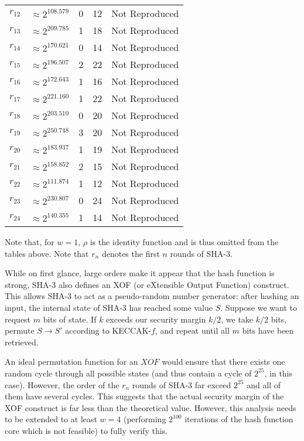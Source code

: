 \documentclass[10pt,twocolumn,twoside]{pnas-new}
\begin{document}
\begin{tabular}{c c c c c}
    $r_{12}$ & $\approx 2^{108.579}$ & 0 & 12 & Not Reproduced \\
    $r_{13}$ & $\approx 2^{209.785}$ & 1 & 18 & Not Reproduced \\
    $r_{14}$ & $\approx 2^{170.621}$ & 0 & 14 & Not Reproduced \\
    $r_{15}$ & $\approx 2^{196.507}$ & 2 & 22 & Not Reproduced \\
    $r_{16}$ & $\approx 2^{172.643}$ & 1 & 16 & Not Reproduced \\
    $r_{17}$ & $\approx 2^{221.160}$ & 1 & 22 & Not Reproduced \\
    $r_{18}$ & $\approx 2^{203.510}$ & 0 & 20 & Not Reproduced \\
    $r_{19}$ & $\approx 2^{250.748}$ & 3 & 20 & Not Reproduced \\
    $r_{20}$ & $\approx 2^{183.937}$ & 1 & 19 & Not Reproduced \\
    $r_{21}$ & $\approx 2^{158.852}$ & 2 & 15 & Not Reproduced \\
    $r_{22}$ & $\approx 2^{111.874}$ & 1 & 12 & Not Reproduced \\
    $r_{23}$ & $\approx 2^{230.807}$ & 0 & 24 & Not Reproduced \\
    $r_{24}$ & $\approx 2^{140.355}$ & 1 & 14 & Not Reproduced
\end{tabular}

Note that, for $w=1$, $\rho$ is the identity function and is thus omitted from
the tables above. Note that $r_{n}$ denotes the first $n$ rounds of SHA-3.

While on first glance, large orders make it appear that the hash function is
strong, SHA-3 also defines an XOF (or eXtensible Output Function) construct.
This allows SHA-3 to act as a pseudo-random number generator: after hashing
an input, the internal state of SHA-3 has reached some value $S$. Suppose we
want to request $m$ bits of state. If $k$ exceeds our security margin $k/2$,
we take $k/2$ bits, permute $S \rightarrow S'$ according to KECCAK-$f$,
and repeat until all $m$ bits have been retrieved.

An ideal permutation function for an $XOF$ would ensure that there exists one
random cycle through all possible states (and thus contain a cycle of $2^{25}$,
in this case). However, the order of the $r_{n}$ rounds of SHA-3 far exceed
$2^{25}$ and all of them have several cycles. This suggests that the actual
security margin of the XOF construct is far less than the theoretical value.
However, this analysis needs to be extended to at least $w=4$ (performing
$2^{100}$ iterations of the hash function core which is not feasible) to
fully verify this.
\end{document}
